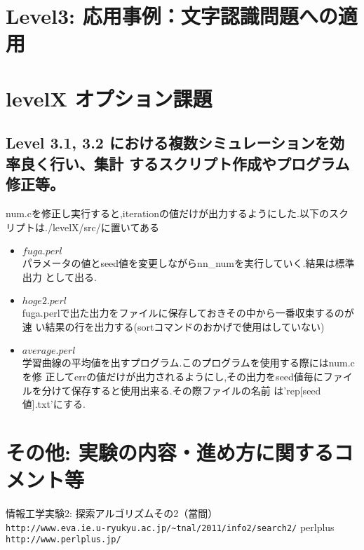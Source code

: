 \documentclass[10pt]{jarticle}
\begin{document}
\newpage

\section{Level3: 応用事例：文字認識問題への適用}





\newpage
\section{levelX オプション課題}
\subsection{Level 3.1, 3.2 における複数シミュレーションを効率良く行い、集計
 するスクリプト作成やプログラム修正等。}
num.cを修正し実行すると,iterationの値だけが出力するようにした.以下のスク
リプトは./levelX/src/に置いてある
\begin{itemize}
 \item $fuga.perl$ \\
パラメータの値とseed値を変更しながらnn\_numを実行していく.結果は標準出力
       として出る.
 \item $hoge2.perl$ \\
fuga.perlで出た出力をファイルに保存しておきその中から一番収束するのが速
       い結果の行を出力する(sortコマンドのおかげで使用はしていない)
 \item $average.perl$ \\
学習曲線の平均値を出すプログラム.このプログラムを使用する際にはnum.cを修
       正してerrの値だけが出力されるようにし,その出力をseed値毎にファイ
       ルを分けて保存すると使用出来る.その際ファイルの名前
       は'rep[seed値].txt'にする.
\end{itemize}
\section{その他: 実験の内容・進め方に関するコメント等}


\vspace{+1.0cm}
\begin{thebibliography}{99}
情報工学実験2: 探索アルゴリズムその2（當間）\\
\verb|http://www.eva.ie.u-ryukyu.ac.jp/~tnal/2011/info2/search2/|
perlplus\\
\verb|http://www.perlplus.jp/|
\end{thebibliography}
\end{document}
